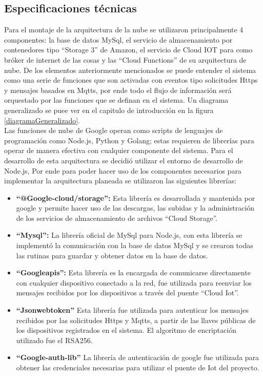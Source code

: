\subsection{Especificaciones técnicas}

Para el montaje de la arquitectura de la nube se utilizaron principalmente 4 componentes: la base de datos MySql, el servicio de almacenamiento por contenedores tipo ``Storage 3'' de Amazon, el servicio de Cloud IOT para como bróker de internet de las cosas y las ``Cloud Functions'' de su arquitectura de nube. De los elementos anteriormente mencionados se puede entender el sistema como una serie de funciones que son activadas con eventos tipo solicitudes Https y mensajes basados en Mqtts, por ende todo el flujo de información será orquestado por las funciones que se definan en el sistema. Un diagrama generalizado se puee ver en el capitulo de introducción en la figura \ref{diagramaGeneralizado}. 
\vspace{0.5cm}\\
Las funciones de nube de Google operan como scripts de lenguajes de programación como Node.js, Python y Golang; estas requieren de librerías para operar de manera efectiva con cualquier componente del sistema. Para el desarrollo de esta arquitectura se decidió utilizar el entorno de desarrollo de Node.js, Por ende para poder hacer uso de los componentes necesarios para implementar la arquitectura planeada se utilizaron las siguientes librerías:

\begin{itemize}
	
	\item \textbf{``@Google-cloud/storage'':} Esta librería es desarrollada y mantenida por google y permite hacer uso de las descargas, las subidas y la administración de los servicios de almacenamiento de archivos ``Cloud Storage''.
	
	\item \textbf{``Mysql'':} La librería oficial de MySql para Node.js, con esta librería se implementó la comunicación con la base de datos MySql y se crearon todas las rutinas para guardar y obtener datos en la base de datos.
	
	\item \textbf{``Googleapis'':} Esta librería es la encargada de comunicarse directamente con cualquier dispositivo conectado a la red, fue utilizada para reenviar los mensajes recibidos por los dispositivos a través del puente ``Cloud Iot''.
	
	\item  \textbf{``Jsonwebtoken''} Esta librería fue utilizada para autenticar los mensajes recibidos por las solicitudes Https y Mqtts, a partir de las llaves públicas de los dispositivos registrados en el sistema. El algoritmo de encriptación utilizado fue el RSA256.
	
	\item  \textbf{``Google-auth-lib''} La librería de autenticación de google fue utilizada para obtener las credenciales necesarias para utilizar el puente de Iot del proyecto.
	
\end{itemize}


